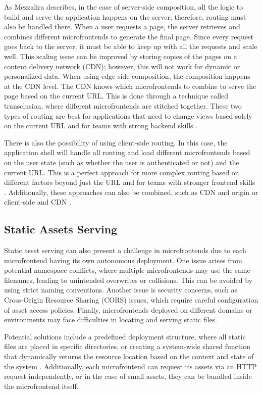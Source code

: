As Mezzalira \cite{MezzaliraBuildingMf} describes, in the case of server-side composition, all the logic to build and serve the application happens on the server; therefore, routing must also be handled there. When a user requests a page, the server retrieves and combines different microfrontends to generate the final page. Since every request goes back to the server, it must be able to keep up with all the requests and scale well. This scaling issue can be improved by storing copies of the pages on a content delivery network (CDN); however, this will not work for dynamic or personalized data. When using edge-side composition, the composition happens at the CDN level. The CDN knows which microfrontends to combine to serve the page based on the current URL. This is done through a technique called transclusion, where different microfrontends are stitched together. These two types of routing are best for applications that need to change views based solely on the current URL and for teams with strong backend skills \cite{MezzaliraBuildingMf}.

There is also the possibility of using client-side routing. In this case, the application shell will handle all routing and load different microfrontends based on the user state (such as whether the user is authenticated or not) and the current URL. This is a perfect approach for more complex routing based on different factors beyond just the URL and for teams with stronger frontend skills \cite{MezzaliraBuildingMf}. Additionally, these approaches can also be combined, such as CDN and origin or client-side and CDN \cite{MezzaliraBuildingMf}.

\subsection{Static Assets Serving}
Static asset serving can also present a challenge in microfrontends due to each microfrontend having its own autonomous deployment. One issue arises from potential namespace conflicts, where multiple microfrontends may use the same filenames, leading to unintended overwrites or collisions. This can be avoided by using strict naming conventions. Another issue is security concerns, such as Cross-Origin Resource Sharing (CORS) issues, which require careful configuration of asset access policies. Finally, microfrontends deployed on different domains or environments may face difficulties in locating and serving static files.

Potential solutions include a predefined deployment structure, where all static files are placed in specific directories, or creating a system-wide shared function that dynamically returns the resource location based on the context and state of the system \cite{Pavlenko}. Additionally, each microfrontend can request its assets via an HTTP request independently, or in the case of small assets, they can be bundled inside the microfrontend itself.

